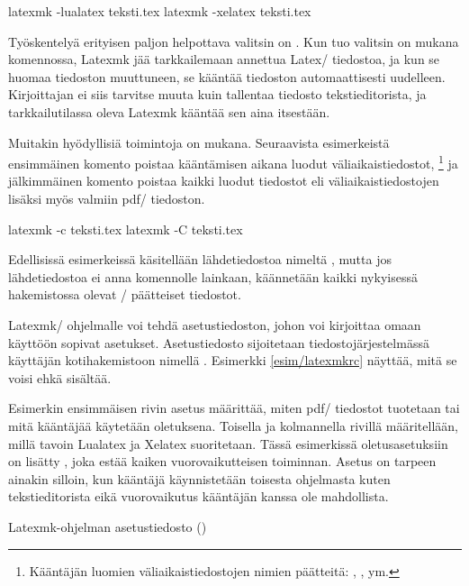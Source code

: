 \begin{koodilohkosis}
latexmk -lualatex teksti.tex
latexmk -xelatex  teksti.tex
\end{koodilohkosis}

Työskentelyä erityisen paljon helpottava valitsin on . Kun
tuo valitsin on mukana komennossa, Latexmk jää tarkkailemaan annettua
Latex\-/ tiedostoa, ja kun se huomaa tiedoston muuttuneen, se kääntää
tiedoston automaattisesti uudelleen. Kirjoittajan ei siis tarvitse muuta
kuin tallentaa tiedosto tekstieditorista, ja tarkkailutilassa oleva
Latexmk kääntää sen aina itsestään.

Muitakin hyödyllisiä toimintoja on mukana. Seuraavista esimerkeistä
ensimmäinen komento poistaa kääntämisen aikana luodut
väliaikaistiedostot,%
\footnote{Kääntäjän luomien väliaikaistiedostojen nimien päätteitä:
  , ,  ym.} ja jälkimmäinen komento
poistaa kaikki luodut tiedostot eli väliaikaistiedostojen lisäksi myös
valmiin pdf\-/ tiedoston.

\begin{koodilohkosis}
latexmk -c teksti.tex
latexmk -C teksti.tex
\end{koodilohkosis}

Edellisissä esimerkeissä käsitellään lähdetiedostoa nimeltä
, mutta jos lähdetiedostoa ei anna komennolle
lainkaan, käännetään kaikki nykyisessä hakemistossa olevat
\-/ päätteiset tiedostot.

Latexmk\-/ ohjelmalle voi tehdä asetustiedoston, johon voi kirjoittaa
omaan käyttöön sopivat asetukset. Asetustiedosto sijoitetaan
tiedostojärjestelmässä käyttäjän kotihakemistoon nimellä
. Esimerkki \ref{esim/latexmkrc} näyttää, mitä se
voisi ehkä sisältää.

Esimerkin ensimmäisen rivin asetus määrittää, miten pdf\-/ tiedostot
tuotetaan tai mitä kääntäjää käytetään oletuksena. Toisella ja
kolmannella rivillä määritellään, millä tavoin Lualatex ja Xelatex
suoritetaan. Tässä esimerkissä oletusasetuksiin on lisätty
, joka estää kaiken vuorovaikutteisen toiminnan.
Asetus on tarpeen ainakin silloin, kun kääntäjä käynnistetään toisesta
ohjelmasta kuten tekstieditorista eikä vuorovaikutus kääntäjän kanssa
ole mahdollista.

\begin{esimerkki*}
  \caption{Latexmk-ohjelman asetustiedosto ()}
  \label{esim/latexmkrc}
\end{esimerkki*}

